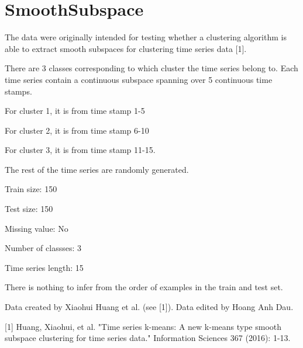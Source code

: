 \chapter{Smooth\+Subspace}
\hypertarget{md_external_2data_2UCRArchive__2018_2SmoothSubspace_2README}{}\label{md_external_2data_2UCRArchive__2018_2SmoothSubspace_2README}
\label{md_external_2data_2UCRArchive__2018_2SmoothSubspace_2README_autotoc_md211}%
%
 The data were originally intended for testing whether a clustering algorithm is able to extract smooth subspaces for clustering time series data \mbox{[}1\mbox{]}.

There are 3 classes corresponding to which cluster the time series belong to. Each time series contain a continuous subspace spanning over 5 continuous time stamps.
\begin{DoxyItemize}
\item For cluster 1, it is from time stamp 1-\/5
\item For cluster 2, it is from time stamp 6-\/10
\item For cluster 3, it is from time stamp 11-\/15.
\end{DoxyItemize}

The rest of the time series are randomly generated.

Train size\+: 150

Test size\+: 150

Missing value\+: No

Number of classses\+: 3

Time series length\+: 15

There is nothing to infer from the order of examples in the train and test set.

Data created by Xiaohui Huang et al. (see \mbox{[}1\mbox{]}). Data edited by Hoang Anh Dau.

\mbox{[}1\mbox{]} Huang, Xiaohui, et al. "{}\+Time series k-\/means\+: A new k-\/means type smooth subspace clustering for time series data."{} Information Sciences 367 (2016)\+: 1-\/13. 